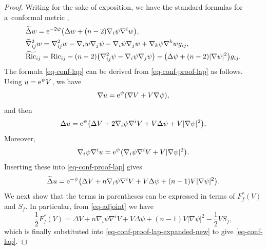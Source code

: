 \documentclass[pdftex]{sigma}
\numberwithin{equation}{section}
\theoremstyle{definition}
\begin{document}
\begin{proof}
	Writing  for the sake of exposition, we have the standard formulas for a~conformal metric ,
	\begin{align}
		&\widetilde\Delta w
={\rm e}^{-2\psi}\bigl(\Delta w+(n-2) \nabla_i\psi \nabla^i w\bigr), \label{eq-conf-proof-lap}\\
&		\widetilde\nabla^2_{ij} w
=\nabla_{ij}^2 w-\nabla_iw \nabla_j\psi-\nabla_i\psi \nabla_jw+\nabla_k\psi \nabla^k w g_{ij}, \label{eq-conf-proof-hess}\\
& \widetilde{\mathrm{Ric}}_{ij}
=\mathrm{Ric}_{ij}-(n-2)\big(\nabla_{ij}^2\psi-\nabla_i\psi \nabla_j\psi\big)
-\big(\Delta\psi+(n-2)|\nabla\psi|^2\big)g_{ij}. \label{eq-conf-proof-ric}
	\end{align}
	The formula \eqref{eq-conf-lap} can be derived from \eqref{eq-conf-proof-lap} as follows. Using $u={\rm e}^{\psi}V$, we have
	\[
	\nabla u={\rm e}^{\psi}(\nabla V+V\nabla\psi),
	\]
	and then
	\[
	\Delta u
	={\rm e}^{\psi}\bigl(\Delta V+2\nabla_i\psi \nabla^i V+V\Delta\psi+V|\nabla\psi|^2\bigr).
	\]
	Moreover,
	\[
	\nabla_i\psi \nabla^i u
	={\rm e}^{\psi}\bigl(\nabla_i\psi \nabla^i V+V|\nabla\psi|^2\bigr).
	\]
	Inserting these into \eqref{eq-conf-proof-lap} gives
	\begin{equation}\label{eq-conf-proof-lap-expanded-new}
		\widetilde\Delta u
		={\rm e}^{-\psi}\bigl(\Delta V+n\nabla_i\psi \nabla^i V+V\Delta\psi+(n-1)V|\nabla\psi|^2\bigr).
	\end{equation}
	We next show that the terms in parentheses can be expressed in terms of $F_f^*(V)$ and $S_f$. In particular, from \eqref{eq-adjoint} we have
	\[
	\frac12 F_f^*(V)
	=\Delta V+n\nabla_i\psi \nabla^i V+V\Delta\psi+(n-1)V|\nabla\psi|^2-\frac12 V S_f,
	\]
	which is finally substituted into \eqref{eq-conf-proof-lap-expanded-new} to give \eqref{eq-conf-lap}.
	

\end{proof}
\end{document}
